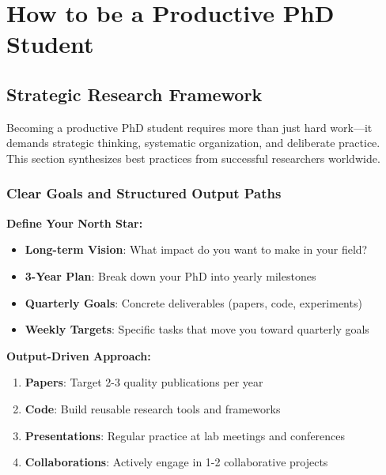 \documentclass[11pt,a4paper]{article}
\begin{document}
\newpage


\newpage

\section{How to be a Productive PhD Student}

\subsection{Strategic Research Framework}

\begin{tcolorbox}[colback=blue!5,colframe=darkblue,title=The Foundation of PhD Success]
Becoming a productive PhD student requires more than just hard work—it demands strategic thinking, systematic organization, and deliberate practice. This section synthesizes best practices from successful researchers worldwide.
\end{tcolorbox}

\subsubsection{Clear Goals and Structured Output Paths}

\textbf{Define Your North Star:}
\begin{itemize}
    \item \textbf{Long-term Vision}: What impact do you want to make in your field?
    \item \textbf{3-Year Plan}: Break down your PhD into yearly milestones
    \item \textbf{Quarterly Goals}: Concrete deliverables (papers, code, experiments)
    \item \textbf{Weekly Targets}: Specific tasks that move you toward quarterly goals
\end{itemize}

\textbf{Output-Driven Approach:}
\begin{enumerate}
    \item \textbf{Papers}: Target 2-3 quality publications per year
    \item \textbf{Code}: Build reusable research tools and frameworks
    \item \textbf{Presentations}: Regular practice at lab meetings and conferences
    \item \textbf{Collaborations}: Actively engage in 1-2 collaborative projects
\end{enumerate}
\end{document}
